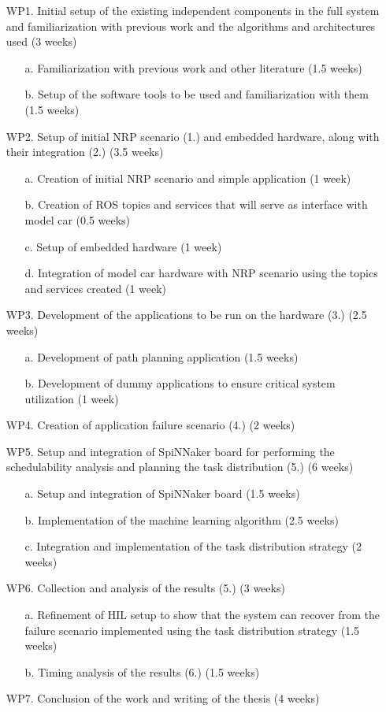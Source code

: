 \begin{enumerate}
\item [WP1.] Initial setup of the existing independent components in the full system and familiarization with previous work and the algorithms and architectures used (3 weeks)
	\begin{enumerate}
	\item [a.]	Familiarization with previous work and other literature (1.5 weeks)
	\item [b.]	Setup of the software tools to be used and familiarization with them (1.5 weeks)
	\end{enumerate}
\item [WP2.] Setup of initial NRP scenario (1.) and embedded hardware, along with their integration (2.) (3.5 weeks)
	\begin{enumerate}
	\item [a.]	Creation of initial NRP scenario and simple application (1 week)
	\item [b.]	Creation of ROS topics and services that will serve as interface with model car (0.5 weeks)
	\item [c.]	Setup of embedded hardware (1 week)
	\item [d.]	Integration of model car hardware with NRP scenario using the topics and services created (1 week)
	\end{enumerate}
\item [WP3.] Development of the applications to be run on the hardware (3.) (2.5 weeks)
	\begin{enumerate}
	\item [a.]	Development of path planning application (1.5 weeks)
	\item [b.]	Development of dummy applications to ensure critical system utilization (1 week)
	\end{enumerate}
\item [WP4.] Creation of application failure scenario (4.) (2 weeks)
\item [WP5.] Setup and integration of SpiNNaker board for performing the schedulability analysis and planning the task distribution (5.) (6 weeks)
	\begin{enumerate}
	\item [a.]	Setup and integration of SpiNNaker board (1.5 weeks)
	\item [b.]	Implementation of the machine learning algorithm (2.5 weeks)
	\item [c.]	Integration and implementation of the task distribution strategy (2 weeks)
	\end{enumerate}
\item [WP6.] Collection and analysis of the results (5.) (3 weeks)
	\begin{enumerate}
	\item [a.]	Refinement of HIL setup to show that the system can recover from the failure scenario implemented using the task distribution strategy (1.5 weeks)
	\item [b.]	Timing analysis of the results (6.) (1.5 weeks)
	\end{enumerate}
\item [WP7.] Conclusion of the work and writing of the thesis (4 weeks)
\end{enumerate}

